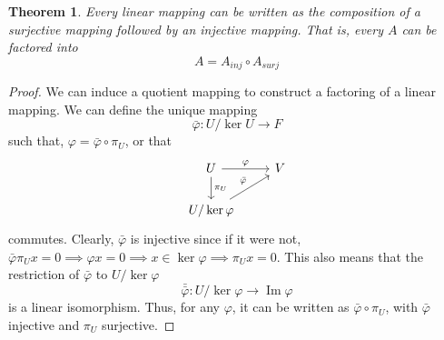\documentclass{article}
\DeclareMathOperator{\im}{Im}
\newtheorem{theorem}{Theorem}[section]
\theoremstyle{remark}
\theoremstyle{definition}
\begin{document}
\begin{theorem}
Every linear mapping can be written as the composition of a surjective mapping followed by an injective mapping. That is, every $A$ can be factored into 
\[A = A_{inj} \circ A_{surj}\]
\end{theorem}
\begin{proof}
We can induce a quotient mapping to construct a factoring of a linear mapping. We can define the unique mapping 
\[\bar{\varphi}: U / \ker{U} \longrightarrow F\]
such that, $\varphi = \bar{\varphi} \circ \pi_U$, or that 
\[\begin{tikzcd}
     U \arrow{r}{\varphi} \arrow{d}{\pi_U} & V \\
     U / \ker{\varphi} \arrow{ru}{\bar{\varphi}}
\end{tikzcd} \]
commutes. Clearly, $\bar{\varphi}$ is injective since if it were not, $\bar{\varphi} \pi_U x = 0 \implies \varphi x = 0 \implies x \in \ker{\varphi} \implies \pi_U x = 0$. This also means that the restriction of $\bar{\varphi}$ to $U / \ker{\varphi}$
\[\bar{\bar{\varphi}}: U / \ker{\varphi} \longrightarrow \im{\varphi}\]
is a linear isomorphism. Thus, for any $\varphi$, it can be written as $\bar{\varphi} \circ \pi_U$, with $\bar{\varphi}$ injective and $\pi_U$ surjective. 
\end{proof}
\end{document}
